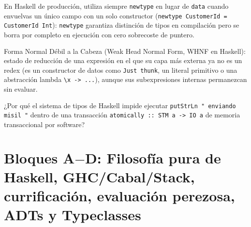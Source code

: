\documentclass{book}
\begin{document}
\begin{tcolorbox}[title={Consejo}, studiumtip, breakable]

En Haskell de producción, utiliza siempre \texttt{newtype} en lugar de \texttt{data} cuando envuelvas un único campo con un solo constructor (\texttt{newtype CustomerId = CustomerId Int}): \texttt{newtype} garantiza distinción de tipos en compilación pero se borra por completo en ejecución con cero sobrecoste de puntero.
\end{tcolorbox}

\begin{tcolorbox}[title={Definición}, studiumdef, breakable]

Forma Normal Débil a la Cabeza (Weak Head Normal Form, WHNF en Haskell): estado de reducción de una expresión en el que su capa más externa ya no es un redex (es un constructor de datos como \texttt{Just thunk}, un literal primitivo o una abstracción lambda \texttt{\textbackslash{}x -> ...}), aunque sus subexpresiones internas permanezcan sin evaluar.
\end{tcolorbox}

\begin{tcolorbox}[title={Autoficha}, studiumcheck, breakable]

¿Por qué el sistema de tipos de Haskell impide ejecutar \texttt{putStrLn " enviando misil "} dentro de una transacción \texttt{atomically :: STM a -> IO a} de memoria transaccional por software?
\end{tcolorbox}

\section{Bloques A\(-\)D: Filosofía pura de Haskell, GHC/Cabal/Stack, currificación, evaluación perezosa, ADTs y Typeclasses}
\end{document}
